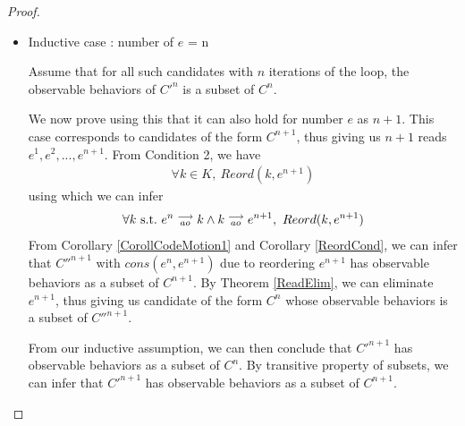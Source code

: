 \begin{proof}
\begin{itemize}
                    \item Inductive case : number of $e$ = n

                    Assume that for all such candidates with $n$ iterations of the loop, the observable behaviors of $C'^n$ is a subset of $C^n$.

                    We now prove using this that it can also hold for number $e$ as $n + 1$. 
                    This case corresponds to candidates of the form $C^{n+1}$, thus giving us $n+1$ reads $e^1, e^2,...,e^{n+1}$.
                    From Condition 2, we have
                    \begin{align*}
                        \forall k \in K, \ Reord(k,e^{n+1})
                    \end{align*}
                    using which we can infer 
                    \begin{align*}
                        \forall k \ \text{s.t.} \ e^n\stackrel{\longrightarrow}{_{ao}}k \wedge k\stackrel{\longrightarrow}{_{ao}}e^{n+1}, \ Reord(k,e^{n+1})
                    \end{align*}
                    From Corollary \ref{CorollCodeMotion1} and Corollary \ref{ReordCond}, we can infer that $C''^{n+1}$ with $cons(e^n, e^{n+1})$ due to reordering $e^{n+1}$ has observable behaviors as a subset of $C^{n+1}$. 
                    By Theorem \ref{ReadElim}, we can eliminate $e^{n+1}$, thus giving us candidate of the form $C^n$ whose observable behaviors is a subset of $C''^{n+1}$.

                    From our inductive assumption, we can then conclude that $C'^{n+1}$ has observable behaviors as a subset of $C^n$. 
                    By transitive property of subsets, we can infer that $C'^{n+1}$ has observable behaviors as a subset of $C^{n+1}$.



                \end{itemize}
                
            \end{proof}


